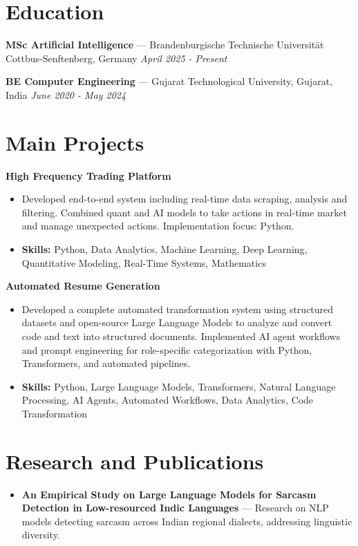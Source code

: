 \documentclass[a4paper,10pt]{article}
\begin{document}
\section*{Education}
\textbf{MSc Artificial Intelligence} — Brandenburgische Technische Universität Cottbus-Senftenberg, Germany \hfill \textit{April 2025 - Present}\par
\vspace{1.5pt}
\textbf{BE Computer Engineering} — Gujarat Technological University, Gujarat, India \hfill \textit{June 2020 - May 2024}\par

\section*{Main Projects}
\textbf{High Frequency Trading Platform}\par
\vspace{1pt}
\begin{itemize}
  \item Developed end-to-end system including real-time data scraping, analysis and filtering. Combined quant and AI models to take actions in real-time market and manage unexpected actions. Implementation focus: Python.
  \item \textbf{Skills:} Python, Data Analytics, Machine Learning, Deep Learning, Quantitative Modeling, Real-Time Systems, Mathematics
\end{itemize}
\vspace{3pt}
\textbf{Automated Resume Generation}\par
\vspace{1pt}
\begin{itemize}
  \item Developed a complete automated transformation system using structured datasets and open-source Large Language Models to analyze and convert code and text into structured documents. Implemented AI agent workflows and prompt engineering for role-specific categorization with Python, Transformers, and automated pipelines.
  \item \textbf{Skills:} Python, Large Language Models, Transformers, Natural Language Processing, AI Agents, Automated Workflows, Data Analytics, Code Transformation
\end{itemize}

\section*{Research and Publications}
\begin{itemize}
\item \textbf{An Empirical Study on Large Language Models for Sarcasm Detection in Low-resourced Indic Languages} — Research on NLP models detecting sarcasm across Indian regional dialects, addressing linguistic diversity.
\end{itemize}
\end{document}
